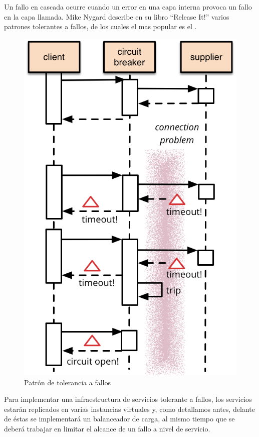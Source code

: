 Un fallo en cascada ocurre cuando un error en una capa interna provoca un fallo en la capa llamada\cite[p.~65]{nygard2007}. Mike Nygard describe en su libro ``Release It!''\cite{nygard2007} varios patrones tolerantes a fallos, de los cuales el mas popular es el .

\begin{figure}[H]
  \includegraphics[width=\linewidth]{src/images/04-capitulo-4/circuit_breaker.png}
  \caption{Patrón de tolerancia a fallos }
  \label{fig:circuit_breaker}
\end{figure}

Para implementar una infraestructura de servicios tolerante a fallos, los servicios estarán replicados en varias instancias virtuales y, como detallamos antes, delante de éstas se implementará un balanceador de carga, al mismo tiempo que se deberá trabajar en limitar el alcance de un fallo a nivel de servicio.

